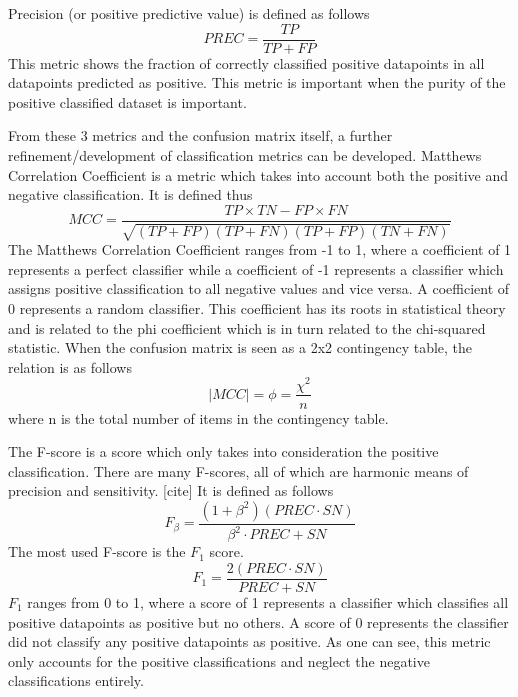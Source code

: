 \documentclass[a4paper,fleqn,usenatbib]{mnras}
\begin{document}
  Precision (or positive predictive value) is defined as follows
  \begin{equation}
  PREC=\frac{TP}{TP+FP}	
  \end{equation}
This metric shows the fraction of correctly classified positive datapoints in all datapoints predicted as positive. This metric is important when the purity of the positive classified dataset is important.

From these 3 metrics and the confusion matrix itself, a further refinement/development of classification metrics can be developed. Matthews Correlation Coefficient is a metric which takes into account both the positive and negative classification. \cite{MCC} It is defined thus
\begin{equation}
MCC = \frac{TP\times TN - FP\times FN}{\sqrt{(TP+FP)(TP+FN)(TP+FP)(TN+FN)}}	
\end{equation}
The Matthews Correlation Coefficient ranges from -1 to 1, where a coefficient of 1 represents a perfect classifier while a coefficient of -1 represents a classifier which assigns positive classification to all negative values and vice versa. A coefficient of 0 represents a random classifier. This coefficient has its roots in statistical theory and is related to the phi coefficient which is in turn related to the chi-squared statistic. When the confusion matrix is seen as a 2x2 contingency table, the relation is as follows
\begin{equation}
|MCC| = \phi = \frac{\chi^2}{n}
\end{equation}
where n is the total number of items in the contingency table. 

The F-score is a score which only takes into consideration the positive classification. There are many F-scores, all of which are harmonic means of precision and sensitivity. [cite] It is defined as follows
\begin{equation}
F_\beta = \frac{(1+\beta^2)(PREC\cdot SN)}{\beta^2 \cdot PREC + SN}
\end{equation}
The most used F-score is the $F_1$ score. 
\begin{equation}
F_1 = \frac{2(PREC\cdot SN)}{PREC + SN}
\end{equation}
$F_1$ ranges from 0 to 1, where a score of 1 represents a classifier which classifies all positive datapoints as positive but no others. A score of 0 represents the classifier did not classify any positive datapoints as positive. As one can see, this metric only accounts for the positive classifications and neglect the negative classifications entirely. 
\end{document}
